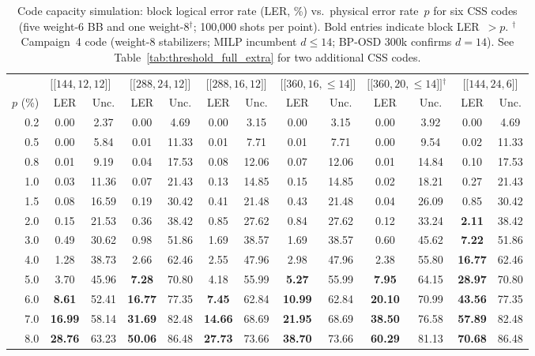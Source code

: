 \documentclass[aps,prxquantum,twocolumn,superscriptaddress,nofootinbib]{revtex4-2}
\newcommand{\dblbrk}[1]{\ensuremath{\lbrack\!\lbrack #1 \rbrack\!\rbrack}}
\newcommand{\code}[1]{\dblbrk{#1}}
\begin{document}
\begin{table}[t]
\centering
\caption{Code capacity simulation: block logical error rate (LER, \%) vs.\ physical error rate~$p$ for six CSS codes (five weight-6 BB and one weight-8$^\dagger$; 100{,}000 shots per point).
Bold entries indicate block LER~$> p$.
$^\dagger$Campaign~4 code (weight-8 stabilizers; MILP incumbent $d \leq 14$; BP-OSD 300k confirms $d = 14$).
See Table~\ref{tab:threshold_full_extra} for two additional CSS codes.}
\label{tab:threshold_full}
\small
\begin{tabular}{r|cc|cc|cc|cc|cc|cc}
\toprule
& \multicolumn{2}{c|}{$\code{144,12,12}$~\cite{bravyi2024high}} & \multicolumn{2}{c|}{$\code{288,24,12}$} & \multicolumn{2}{c|}{$\code{288,16,12}$} & \multicolumn{2}{c|}{$\code{360,16,{\leq}14}$} & \multicolumn{2}{c|}{$\code{360,20,{\leq}14}$$^\dagger$} & \multicolumn{2}{c}{$\code{144,24,6}$} \\
$p$ (\%) & LER & Unc. & LER & Unc. & LER & Unc. & LER & Unc. & LER & Unc. & LER & Unc. \\
\midrule
0.2 & 0.00 & 2.37 & 0.00 & 4.69 & 0.00 & 3.15 & 0.00 & 3.15 & 0.00 & 3.92 & 0.00 & 4.69 \\
0.5 & 0.00 & 5.84 & 0.01 & 11.33 & 0.01 & 7.71 & 0.01 & 7.71 & 0.00 & 9.54 & 0.02 & 11.33 \\
0.8 & 0.01 & 9.19 & 0.04 & 17.53 & 0.08 & 12.06 & 0.07 & 12.06 & 0.01 & 14.84 & 0.10 & 17.53 \\
1.0 & 0.03 & 11.36 & 0.07 & 21.43 & 0.13 & 14.85 & 0.15 & 14.85 & 0.02 & 18.21 & 0.27 & 21.43 \\
1.5 & 0.08 & 16.59 & 0.19 & 30.42 & 0.41 & 21.48 & 0.43 & 21.48 & 0.04 & 26.09 & 0.85 & 30.42 \\
2.0 & 0.15 & 21.53 & 0.36 & 38.42 & 0.85 & 27.62 & 0.84 & 27.62 & 0.12 & 33.24 & \textbf{2.11} & 38.42 \\
3.0 & 0.49 & 30.62 & 0.98 & 51.86 & 1.69 & 38.57 & 1.69 & 38.57 & 0.60 & 45.62 & \textbf{7.22} & 51.86 \\
4.0 & 1.28 & 38.73 & 2.66 & 62.46 & 2.55 & 47.96 & 2.98 & 47.96 & 2.38 & 55.80 & \textbf{16.77} & 62.46 \\
5.0 & 3.70 & 45.96 & \textbf{7.28} & 70.80 & 4.18 & 55.99 & \textbf{5.27} & 55.99 & \textbf{7.95} & 64.15 & \textbf{28.97} & 70.80 \\
6.0 & \textbf{8.61} & 52.41 & \textbf{16.77} & 77.35 & \textbf{7.45} & 62.84 & \textbf{10.99} & 62.84 & \textbf{20.10} & 70.99 & \textbf{43.56} & 77.35 \\
7.0 & \textbf{16.99} & 58.14 & \textbf{31.69} & 82.48 & \textbf{14.66} & 68.69 & \textbf{21.95} & 68.69 & \textbf{38.50} & 76.58 & \textbf{57.89} & 82.48 \\
8.0 & \textbf{28.76} & 63.23 & \textbf{50.06} & 86.48 & \textbf{27.73} & 73.66 & \textbf{38.70} & 73.66 & \textbf{60.29} & 81.13 & \textbf{70.68} & 86.48 \\
\bottomrule
\end{tabular}
\end{table}
\end{document}
